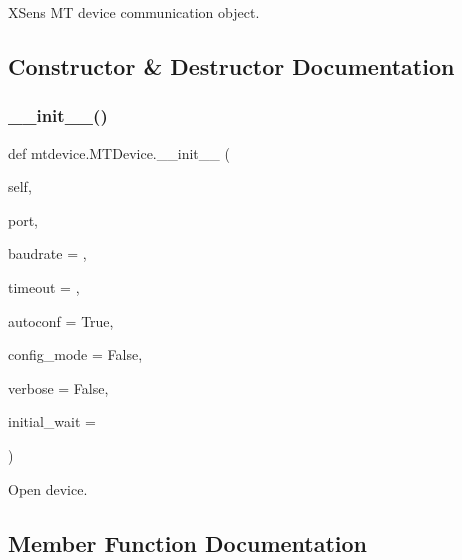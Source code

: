 \begin{DoxyVerb}XSens MT device communication object.\end{DoxyVerb}
 

\subsection{Constructor \& Destructor Documentation}
\mbox{\label{classmtdevice_1_1MTDevice_a9a93b603a3c9ab6a7ad9027e436799d4}} 
\subsubsection{\texorpdfstring{\+\_\+\+\_\+init\+\_\+\+\_\+()}{\_\_init\_\_()}}
{\footnotesize\ttfamily def mtdevice.\+M\+T\+Device.\+\_\+\+\_\+init\+\_\+\+\_\+ (\begin{DoxyParamCaption}\item[{}]{self,  }\item[{}]{port,  }\item[{}]{baudrate = {},  }\item[{}]{timeout = {},  }\item[{}]{autoconf = {\ttfamily True},  }\item[{}]{config\+\_\+mode = {\ttfamily False},  }\item[{}]{verbose = {\ttfamily False},  }\item[{}]{initial\+\_\+wait = {} }\end{DoxyParamCaption})}

\begin{DoxyVerb}Open device.\end{DoxyVerb}
 

\subsection{Member Function Documentation}
\mbox{\label{classmtdevice_1_1MTDevice_af18ecf9cbdca13076b655a6b83f8fab2}} 
